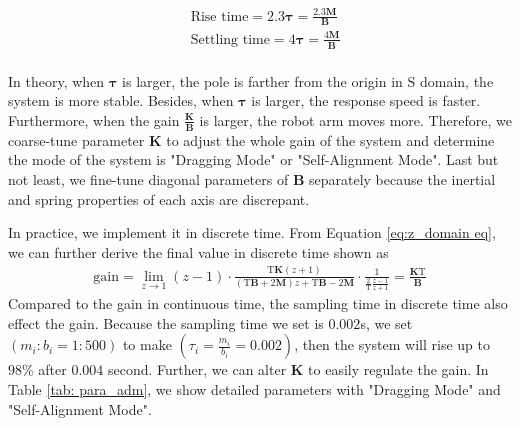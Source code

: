 \begin{equation}
\begin{split}
&\text{Rise time} = 2.3\boldsymbol{\tau} = \frac{2.3 \mathbf{M}}{\mathbf{B}}\\
&\text{Settling time} = 4\boldsymbol{\tau} =  \frac{4 \mathbf{M}}{\mathbf{B}}\\
\end{split}
\end{equation}
\par
In theory, when $\boldsymbol{\tau}$ is larger, the pole is farther from the origin in $\mathrm{S}$ domain, the system is more stable. Besides, when $\boldsymbol{\tau}$ is larger, the response speed is faster. Furthermore, when the gain $\frac{\mathbf{K}}{\mathbf{B}}$ is larger, the robot arm moves more. Therefore, we coarse-tune parameter $\mathbf{K}$ to adjust the whole gain of the system and determine the mode of the system is "Dragging Mode" or "Self-Alignment Mode". Last but not least, we fine-tune diagonal parameters of $\mathbf{B}$ separately because the inertial and spring properties of each axis are discrepant. 
\par
In practice, we implement it in discrete time. From Equation \ref{eq:z_domain eq}, we can further derive the final value in discrete time shown as 
\begin{equation}
\begin{split}
\text{gain} = \lim_{z \to 1} (z-1)\cdot \frac{\mathrm{T}\mathbf{K}(z+1)}{(\mathrm{T}\mathbf{B}+2\mathbf{M})z+\mathrm{T}\mathbf{B}-2\mathbf{M}}\cdot \frac{1}{\frac{2}{\mathrm{T}}\frac{z-1}{z+1}} = \frac{\mathbf{K}\mathrm{T}}{\mathbf{B}}
\end{split}
\end{equation}
Compared to the gain in continuous time, the sampling time in discrete time also effect the gain. Because the sampling time we set is $0.002$s, we set $(m_i : b_i = 1 : 500)$  to make $(\tau _i = \frac{m_i}{b_i} = 0.002)$, then the system will rise up to $98\%$ after $0.004$ second. Further, we can alter $\mathbf{K}$ to easily regulate the gain. In Table \ref{tab: para_adm}, we show detailed parameters with "Dragging Mode" and "Self-Alignment Mode".
